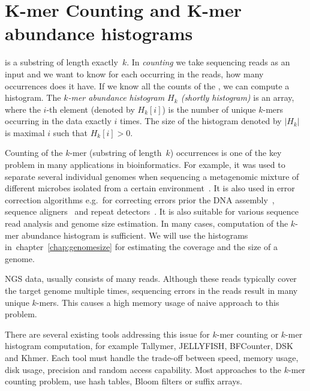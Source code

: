 \chapter{K-mer Counting and K-mer abundance histograms}


\Kmer is a substring of length exactly~$k$. In \emph{\kmer counting} we take sequencing reads as an input and we want to know for each \kmer occurring in the reads, how many occurrences does it have. If we know all the counts of the \kmers, we can compute a \kmer histogram.
The \emph{$k$-mer abundance histogram $H_k$ (shortly \kmer histogram)} is an array, where the $i$-th element (denoted by $H_k[i]$) is the number of unique $k$-mers occurring in the data exactly $i$ times. The size of the histogram denoted by $|H_k|$ is maximal $i$ such that $H_k[i] > 0$.

Counting of the $k$-mer (substring of length~$k$) occurrences is one of the key problem in many applications in bioinformatics.
For example, it was used to separate several individual
genomes when sequencing a metagenomic mixture of different microbes isolated from a certain environment~\cite{Wu2011, Wang2012}.
It is also used in error correction algorithms e.g.\ for correcting errors prior the DNA assembly~\cite{Pevzner2001}, sequence aligners~\cite{edgar2004muscle} and repeat detectors~\cite{caponnetto2013efficiency}.
It is also suitable for various sequence read analysis and genome size estimation\cite{covest, williams, waterman}. In many cases, computation of the $k$-mer abundance histogram is sufficient.
We will use the \kmer histograms in~chapter~\ref{chap:genomesize} for estimating the coverage and the size of a genome.

NGS data, usually consists of many reads. Although these reads typically cover the target genome multiple times, sequencing errors in the reads result in many unique $k$-mers.
This causes a high memory usage of naive approach to this problem.

There are several existing tools addressing this issue for $k$-mer counting or $k$-mer histogram computation, for example Tallymer\cite{tallymer}, JELLYFISH\cite{jellyfish}, BFCounter\cite{bfcounter}, DSK\cite{dsk} and Khmer\cite{khmer}. Each tool must handle the trade-off between speed, memory usage, disk usage, precision and random access capability. Most approaches to the $k$-mer counting problem, use hash tables, Bloom filters or suffix arrays.

